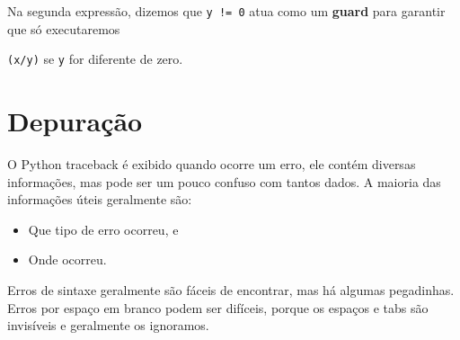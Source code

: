 Na segunda expressão, dizemos que {\tt y != 0} atua como um {\bf guard}
para garantir que só executaremos {{\tt (x/y)} se {\tt y} for diferente de zero.


\section{Depuração}

\label{whitespace}


O Python traceback é exibido quando ocorre um erro, ele contém
diversas informações, mas pode ser um pouco confuso com tantos
dados. A maioria das informações úteis geralmente são:


\begin{itemize}

\item Que tipo de erro ocorreu, e

\item Onde ocorreu.

\end{itemize}




Erros de sintaxe geralmente são fáceis de encontrar, mas há algumas
pegadinhas. Erros por espaço em branco podem ser difíceis, porque os espaços e
tabs são invisíveis e geralmente os ignoramos.



}
